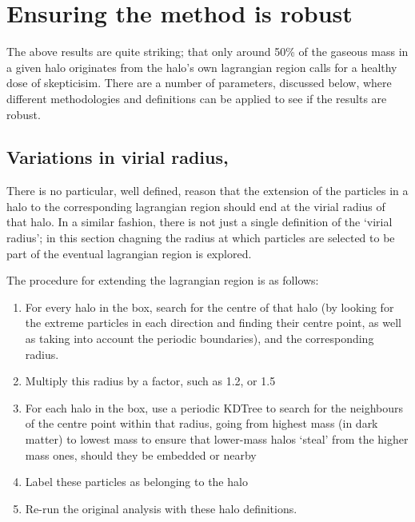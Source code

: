\section{Ensuring the method is robust}
\label{sec:robustness}

The above results are quite striking; that only around 50\% of the gaseous
mass in a given halo originates from the halo's own lagrangian region calls
for a healthy dose of skepticisim. There are a number of parameters, discussed
below, where different methodologies and definitions can be applied to see
if the results are robust.

\subsection{Variations in virial radius, \rvir{}}

There is no particular, well defined, reason that the extension of the particles
in a halo to the corresponding lagrangian region should end at the virial radius
of that halo. In a similar fashion, there is not just a single definition of the
`virial radius'; in this section chagning the radius at which particles are
selected to be part of the eventual lagrangian region is explored.

The procedure for extending the lagrangian region is as follows:
\begin{enumerate}
    \item For every halo in the box, search for the centre of that halo (by
          looking for the extreme particles in each direction and finding
          their centre point, as well as taking into account the periodic
          boundaries), and the corresponding radius.
    \item Multiply this radius by a factor, such as 1.2, or 1.5
    \item For each halo in the box, use a periodic KDTree to search for the
          neighbours of the centre point within that radius, going from
          highest mass (in dark matter) to lowest mass to ensure that
          lower-mass halos `steal' from the higher mass ones, should they
          be embedded or nearby
    \item Label these particles as belonging to the halo
    \item Re-run the original analysis with these halo definitions.
\end{enumerate}

